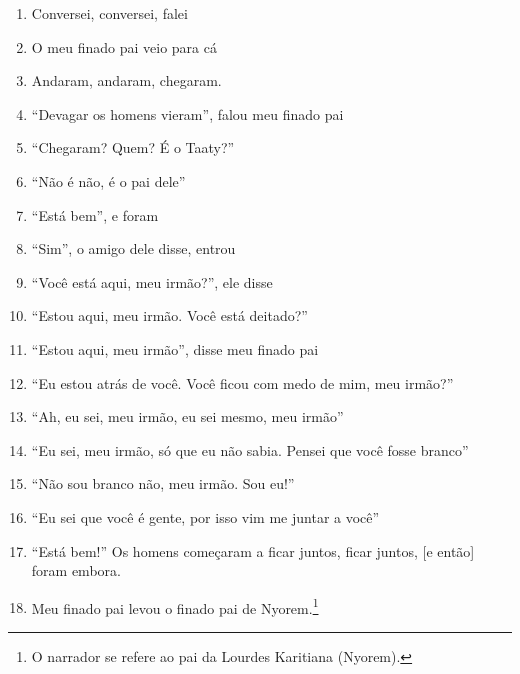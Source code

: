 \begin{enumerate}
 \item Conversei, conversei, falei

 \item O meu finado pai veio para cá

 \item Andaram, andaram, chegaram.

 \item ``Devagar os homens vieram'', falou meu finado pai

 \item ``Chegaram? Quem? É o Taaty?''

 \item ``Não é não, é o pai dele''

 \item ``Está bem'', e foram

 \item ``Sim'', o amigo dele disse, entrou

 \item ``Você está aqui, meu irmão?'', ele disse

 \item ``Estou aqui, meu irmão. Você está deitado?''

 \item ``Estou aqui, meu irmão'', disse meu finado pai

 \item ``Eu estou atrás de você. Você ficou com medo de mim, meu irmão?''

 \item ``Ah, eu sei, meu irmão, eu sei mesmo, meu irmão''

 \item ``Eu sei, meu irmão, só que eu não sabia. Pensei que você fosse branco''

 \item ``Não sou branco não, meu irmão. Sou eu!''

 \item ``Eu sei que você é gente, por isso vim me juntar a você''

 \item ``Está bem!'' Os homens começaram a ficar juntos, ficar juntos, {[}e então{]} foram embora.

 \begin{center}\end{center}

 \item Meu finado pai levou o finado pai de Nyorem.\footnote{O narrador se
   refere ao pai da Lourdes Karitiana (Nyorem).}


\end{enumerate}
